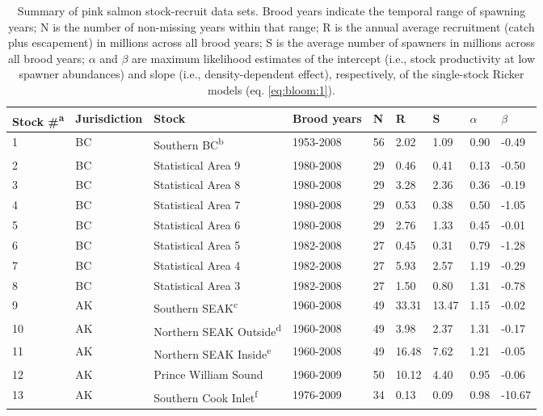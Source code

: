 {\small
\begin{longtable}{lllllllll}
\caption{Summary of pink salmon stock-recruit data sets. Brood
years indicate the temporal range of spawning years; N is the number of
non-missing years within that range; R is the annual average recruitment
(catch plus escapement) in millions across all brood years; S is the
average number of spawners in millions across all brood years;
$\alpha$ and $\beta$ are maximum likelihood estimates of the
intercept (i.e., stock productivity at low spawner abundances) and slope
(i.e., density-dependent effect), respectively, of the single-stock
Ricker models (eq. \ref{eq:bloom:1}).} \\ 
  \hline
Stock \#\textsuperscript{a} & Jurisdiction & Stock & Brood years & N & R & S & $\alpha$ & $\beta$ \\ 
  \hline
1 & BC & Southern BC\textsuperscript{b} & 1953-2008 &  56 & 2.02 & 1.09 & 0.90 & -0.49 \\ 
  2 & BC & Statistical Area 9 & 1980-2008 &  29 & 0.46 & 0.41 & 0.13 & -0.50 \\ 
  3 & BC & Statistical Area 8 & 1980-2008 &  29 & 3.28 & 2.36 & 0.36 & -0.19 \\ 
  4 & BC & Statistical Area 7 & 1980-2008 &  29 & 0.53 & 0.38 & 0.50 & -1.05 \\ 
  5 & BC & Statistical Area 6 & 1980-2008 &  29 & 2.76 & 1.33 & 0.45 & -0.01 \\ 
  6 & BC & Statistical Area 5 & 1982-2008 &  27 & 0.45 & 0.31 & 0.79 & -1.28 \\ 
  7 & BC & Statistical Area 4 & 1982-2008 &  27 & 5.93 & 2.57 & 1.19 & -0.29 \\ 
  8 & BC & Statistical Area 3 & 1982-2008 &  27 & 1.50 & 0.80 & 1.31 & -0.78 \\ 
  9 & AK & Southern SEAK\textsuperscript{c} & 1960-2008 &  49 & 33.31 & 13.47 & 1.15 & -0.02 \\ 
  10 & AK & Northern SEAK Outside\textsuperscript{d} & 1960-2008 &  49 & 3.98 & 2.37 & 1.31 & -0.17 \\ 
  11 & AK & Northern SEAK Inside\textsuperscript{e} & 1960-2008 &  49 & 16.48 & 7.62 & 1.21 & -0.05 \\ 
  12 & AK & Prince William Sound & 1960-2009 &  50 & 10.12 & 4.40 & 0.95 & -0.06 \\ 
  13 & AK & Southern Cook Inlet\textsuperscript{f} & 1976-2009 &  34 & 0.13 & 0.09 & 0.98 & -10.67 \\ 

\end{longtable}}
